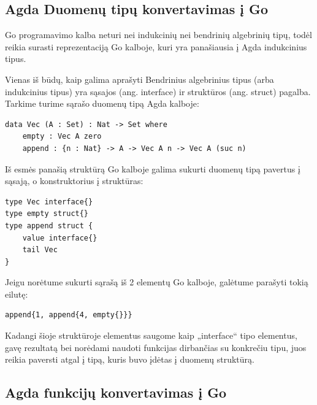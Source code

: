 \documentclass{VUMIFPSkursinis}
\begin{document}
\subsection{Agda Duomenų tipų konvertavimas į Go}
Go programavimo kalba neturi nei indukcinių nei bendrinių algebrinių tipų, todėl reikia surasti reprezentaciją Go kalboje, kuri yra panašiausia į Agda indukcinius tipus.\par Vienas iš būdų, kaip galima aprašyti Bendrinius algebrinius tipus (arba indukcinius tipus) yra sąsajos (ang. interface) ir struktūros (ang. struct) pagalba. Tarkime turime sąrašo duomenų tipą Agda kalboje:
\begin{lstlisting}
data Vec (A : Set) : Nat -> Set where
	empty : Vec A zero
	append : {n : Nat} -> A -> Vec A n -> Vec A (suc n)
\end{lstlisting}
Iš esmės panašią struktūrą Go kalboje galima sukurti duomenų tipą pavertus į sąsają, o konstruktorius į struktūras:
\begin{lstlisting}[language=GoCust]
type Vec interface{}
type empty struct{}
type append struct {
	value interface{}
	tail Vec
}
\end{lstlisting}
Jeigu norėtume sukurti sąrašą iš 2 elementų Go kalboje, galėtume parašyti tokią eilutę: 
\begin{lstlisting}[language=GoCust]
append{1, append{4, empty{}}}
	\end{lstlisting}
Kadangi šioje struktūroje elementus saugome kaip „interface{}“ tipo elementus, gavę rezultatą bei norėdami naudoti funkcijas dirbančias su konkrečiu tipu, juos reikia paversti atgal į tipą, kuris buvo įdėtas į duomenų struktūrą.
\subsection{Agda funkcijų konvertavimas į Go}
\end{document}
